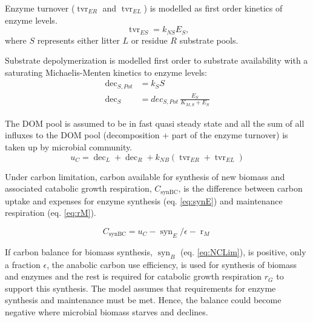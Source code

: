 Enzyme turnover ($\operatorname{tvr}_{ER}$ and $\operatorname{tvr}_{EL}$) is
modelled as first order kinetics of enzyme levels.
\begin{equation}
\label{eq:tvrE}
\operatorname{tvr}_{ES} = k_{NS} E_S \text{,}
\end{equation}
where $S$ represents either litter $L$ or residue $R$ substrate pools.  

% 
Substrate depolymerization is modelled first order to substrate
availability with a saturating Michaelis-Menten kinetics to enzyme levels:
\begin{subequations}
\label{eq:dec}
\begin{align}
\operatorname{dec}_{S,Pot} &= k_S S
\\ 
\operatorname{dec}_S &= dec_{S,Pot} \, \frac{E_S}{K_{M,S} + E_S}
\end{align}
\end{subequations}
 
The DOM pool is assumed to be in fast quasi steady state and all the sum of all
influxes to the DOM pool (decomposition + part of the enzyme turnover) is taken
up by microbial community.
\begin{equation}
\label{eq:uC}
u_C = \operatorname{dec}_L + \operatorname{dec}_R +  k_{NB}
(\operatorname{tvr}_{ER} + \operatorname{tvr}_{EL})
\end{equation}

Under carbon limitation, carbon available for synthesis of new biomass and
associated catabolic growth respiration, $C_{\operatorname{synBC}}$, is the
difference between carbon uptake and expenses for enzyme synthesis (eq.
\ref{eq:synE}) and maintenance respiration (eq.
\ref{eq:rM}).

\begin{equation}
\label{eq:synBC} 
C_{\operatorname{synBC}} = u_C -
\operatorname{syn}_E/\epsilon - \operatorname{r}_{M}
\end{equation}

If carbon balance for biomass synthesis, $\operatorname{syn}_B$ (eq.
\ref{eq:NCLim}), is positive, only a fraction $\epsilon$, the anabolic
carbon use efficiency, is used for synthesis of biomass and enzymes
and the rest is required for catabolic growth respiration $r_G$ to support this
synthesis.
The model assumes that requirements for enzyme synthesis and maintenance must be
met. Hence, the balance could become negative where microbial biomass starves
and declines.

